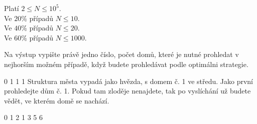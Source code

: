 \smallskip
\noindent
Platí $2 \leq N \leq 10^5$.\\
Ve $20\%$ případů $N \leq 10$.\\
Ve $40\%$ případů $N \leq 20$.\\
Ve $60\%$ případů $N \leq 1000$.


Na výstup vypište právě jedno číslo, počet domů, které je nutné prohledat v
nejhorším možném případě, když budete prohledávat podle optimálni strategie.


0 1 1 1
\sampleCOMMENT
Struktura města vypadá jako hvězda, s domem č. 1 ve středu.
\sampleCOMMENT
Jako první prohledejte dům č. 1.
Pokud tam zloděje nenajdete, tak po vyslíchání už budete vědět, ve kterém domě se nachází.
\sampleEND


\bigskip


0 1 2 1 3 5 6
\sampleEND



